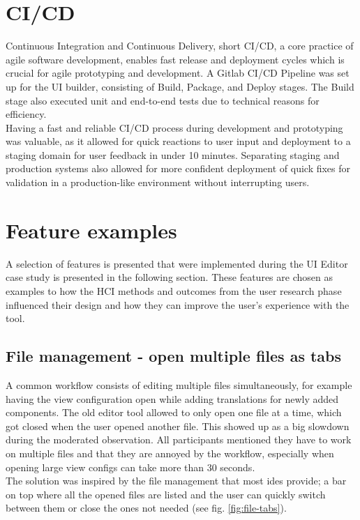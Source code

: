 \section{CI/CD}

Continuous Integration and Continuous Delivery, short CI/CD, a core practice of agile software development, enables fast release and deployment cycles which is crucial for agile prototyping and development.
A Gitlab CI/CD Pipeline was set up for the UI builder, consisting of Build, Package, and Deploy stages.
The Build stage also executed unit and end-to-end tests due to technical reasons for efficiency.\\
Having a fast and reliable CI/CD process during development and prototyping was valuable, as it allowed for quick reactions to user input and deployment to a staging domain for user feedback in under 10 minutes.
Separating staging and production systems also allowed for more confident deployment of quick fixes for validation in a production-like environment without interrupting users.

\section{Feature examples}

A selection of features is presented that were implemented during the UI Editor case study is presented in the following section.
These features are chosen as examples to how the HCI methods and outcomes from the user research phase influenced their design and how they can improve the user's experience with the tool. 

\subsection{File management - open multiple files as tabs}

A common workflow consists of editing multiple files simultaneously, for example having the view configuration open while adding translations for newly added components.
The old editor tool allowed to only open one file at a time, which got closed when the user opened another file. This showed up as a big slowdown during the moderated observation.
All participants mentioned they have to work on multiple files and that they are annoyed by the workflow, especially when opening large view configs can take more than 30 seconds.
\\
The solution was inspired by the file management that most \Gls{ide}s provide; a bar on top where all the opened files are listed and the user can quickly switch between them or close the ones not needed (see fig. \ref{fig:file-tabs}). 

